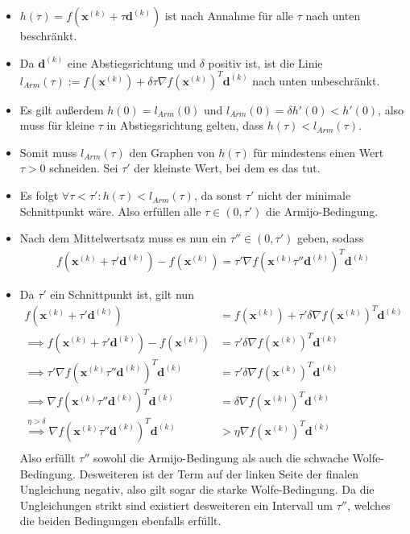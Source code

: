 \documentclass{report}
\newcommand{\xk}{\bm{x}^{(k)}}
\newcommand{\dk}{\bm{d}^{(k)}}
\begin{document}
\begin{itemize}
 \item $h(\tau) = f(\xk + \tau \dk)$ ist nach Annahme für alle $\tau$ nach unten beschränkt.
 \item Da $\dk$ eine Abstiegsrichtung und $\delta$ positiv ist, ist die Linie $l_{Arm}(\tau) := f(\xk) + \delta \tau \nabla f(\xk)^T \dk$ nach unten unbeschränkt.
 \item Es gilt außerdem $h(0) = l_{Arm}(0)$ und $l_{Arm}(0) = \delta h'(0) < h'(0)$, also muss für kleine $\tau$ in Abstiegsrichtung gelten, dass $h(\tau) < l_{Arm}(\tau)$.
 \item Somit muss $l_{Arm}(\tau)$ den Graphen von $h(\tau)$ für mindestens einen Wert $\tau > 0$ schneiden. Sei $\tau'$ der kleinste Wert, bei dem es das tut.
 \item Es folgt $\forall \tau < \tau': h(\tau) < l_{Arm}(\tau)$, da sonst $\tau'$ nicht der minimale Schnittpunkt wäre. Also erfüllen alle $\tau \in (0, \tau')$ die Armijo-Bedingung.
 \item Nach dem Mittelwertsatz muss es nun ein $\tau'' \in (0, \tau')$ geben, sodass
 \begin{align*}
  f(\xk + \tau' \dk) - f(\xk) = \tau' \nabla f(\xk \tau'' \dk)^T \dk
 \end{align*}
 \item Da $\tau'$ ein Schnittpunkt ist, gilt nun
 \begin{align*}
  f(\xk + \tau' \dk) &= f(\xk) + \tau' \delta \nabla f(\xk)^T \dk\\
  \implies f(\xk + \tau' \dk) - f(\xk) &= \tau' \delta \nabla f(\xk)^T \dk\\
  \implies \tau' \nabla f(\xk \tau'' \dk)^T \dk &= \tau' \delta \nabla f(\xk)^T \dk\\
  \implies \nabla f(\xk \tau'' \dk)^T \dk &= \delta \nabla f(\xk)^T \dk\\
  \overset{\eta > \delta}{\implies} \nabla f(\xk \tau'' \dk)^T \dk &> \eta\nabla f(\xk)^T \dk\\
 \end{align*}
Also erfüllt $\tau''$ sowohl die Armijo-Bedingung als auch die schwache Wolfe-Bedingung. Desweiteren ist der Term auf der linken Seite der finalen Ungleichung negativ, also gilt sogar die starke Wolfe-Bedingung. Da die Ungleichungen strikt sind existiert desweiteren ein Intervall um $\tau''$, welches die beiden Bedingungen ebenfalls erfüllt.
\end{itemize}
\end{document}
